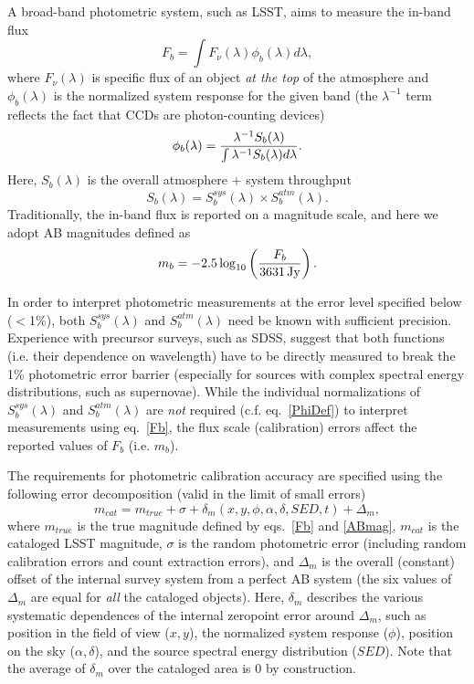 A broad-band photometric system, such as LSST, aims to measure the in-band
flux
\begin{equation}
\label{Fb}
             F_b = \int{F_\nu(\lambda) \phi_b(\lambda) d\lambda},
\end{equation}
where $F_\nu(\lambda)$ is specific flux of an object {\it at the top} of
the atmosphere and $\phi_b(\lambda)$ is the normalized system response
for the given band (the $\lambda^{-1}$  term reflects the fact that CCDs
are photon-counting devices)
\begin{equation}
\label{PhiDef}
\phi_b(\lambda) = {\lambda^{-1} S_b(\lambda) \over \int{\lambda^{-1} S_b(\lambda) d\lambda}}.
\end{equation}
Here, $S_b(\lambda)$ is the overall atmosphere + system throughput
\begin{equation}
\label{SDef}
         S_b(\lambda) = S_b^{sys}(\lambda) \times S_b^{atm}(\lambda).
\end{equation}
Traditionally, the in-band flux is reported on a magnitude scale,
and here we adopt AB magnitudes defined as
\begin{equation}
\label{ABmag}
             m_b = -2.5\log_{10}\left({F_b \over 3631 \, {\rm Jy}}\right).
\end{equation}

In order to interpret photometric measurements at the error level
specified below ($<$1\%), both $S_b^{sys}(\lambda)$ and $S_b^{atm}(\lambda)$
need be known with sufficient precision. Experience with precursor surveys,
such as SDSS, suggest that both functions (i.e. their dependence on
wavelength) have to be directly measured to break the 1\% photometric error
barrier (especially for sources with complex spectral energy distributions,
such as supernovae). While the individual normalizations of $S_b^{sys}(\lambda)$ and
$S_b^{atm}(\lambda)$ are {\it not} required (c.f. eq.~\ref{PhiDef}) to
interpret measurements using eq.~\ref{Fb}, the flux scale (calibration)
errors affect the reported values of $F_b$ (i.e. $m_b$).

The requirements for photometric calibration accuracy are specified using
the following error decomposition (valid in the limit of small errors)
\begin{equation}
\label{photoSysErr}
 m_{cat} = m_{true} + \sigma + \delta_m(x,y,\phi,\alpha,\delta,SED,t) + \Delta_m,
\end{equation}
where $m_{true}$ is the true magnitude defined by eqs.~\ref{Fb} and
\ref{ABmag}, $m_{cat}$ is the cataloged LSST magnitude, $\sigma$ is the random
photometric error (including random calibration errors and count extraction
errors), and $\Delta_m$ is the overall (constant) offset of the
internal survey system from a perfect AB system (the six values of $\Delta_m$
are equal for {\it all} the cataloged objects). Here, $\delta_m$ describes
the various systematic dependences of the internal zeropoint error around
$\Delta_m$, such as position in the field of view ($x,y$), the normalized
system response ($\phi$), position on the sky ($\alpha, \delta$), and
the source spectral energy distribution ($SED$). Note that the average of
$\delta_m$ over the cataloged area is 0 by construction.

